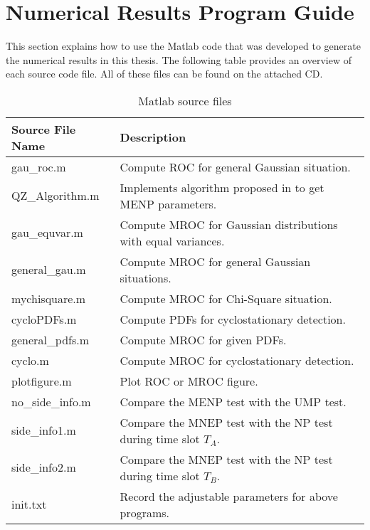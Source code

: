 \resetdatestamp

\chapter{Numerical Results Program Guide}
\label{A:LaTeXmacros}

This section explains how to use the Matlab code that was developed to generate the numerical results in this thesis.  The following table provides an overview of each source code file. All of these files can be found on the attached CD. 

\begin{table}[h]
\begin{tabular}{l|p{350pt}}
\hline
\hline
Source File Name                  & Description                                                                \\ \hline
gau\_roc.m      & Compute ROC for general Gaussian situation.              \\
QZ\_Algorithm.m & Implements algorithm proposed in \cite{zhang2000efficient} to get MENP parameters.                \\
gau\_equvar.m   & Compute MROC for Gaussian distributions with equal variances. \\
general\_gau.m         & Compute MROC for general Gaussian situations.                   \\
mychisquare.m            & Compute MROC for Chi-Square situation.                        \\
cycloPDFs.m              & Compute PDFs for cyclostationary detection.                 \\ 
general\_pdfs.m           & Compute MROC for given PDFs.                                 \\
cyclo.m				     & Compute MROC for cyclostationary detection.             \\		
plotfigure.m             & Plot ROC or MROC figure. \\
no\_side\_info.m           & Compare the MENP test with the UMP test. \\
side\_info1.m            & Compare the MNEP test with the NP test during time slot $T_A$.\\
side\_info2.m            & Compare the MNEP test with the NP test during time slot $T_B$.\\
init.txt                   & Record the adjustable parameters for above programs.         \\
\hline
\end{tabular}
\label{filelist}
\caption{Matlab source files}
\end{table}

